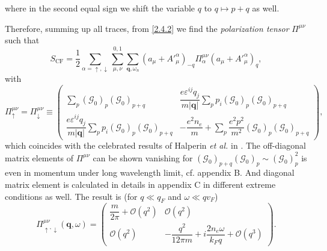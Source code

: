 \documentclass[bachelor,english,numbers]{ustcthesis}
\begin{document}
		where in the second equal sign we shift the variable $q$ to $q\mapsto p+q$ as well.\par
		Therefore, summing up all traces, from \eqref{2.4.2} we find the \emph{polarization tensor} $\Pi^{\mu \nu}$ such that
		\begin{equation}\label{2.4.8}
			S_{\text{CF}}=\dfrac{1}{2}\sum_{\alpha=\uparrow,\downarrow}\sum_{\mu,\nu}^{0,1}\sum_{\bm{q},\omega_n}\left(a_\mu+{A'}_\mu^\alpha\right)_{-q}\Pi^{\mu\nu}_\alpha\left(a_\mu+{A'}_\mu^\alpha\right)_{q},
		\end{equation}
		with
		\begin{equation}\label{2.4.9}
			\Pi^{\mu\nu}_\uparrow=\Pi^{\mu\nu}_\downarrow\equiv \left(\begin{array}{cc}
				\displaystyle\sum_p(\mathcal{G}_0)_p(\mathcal{G}_0)_{p+q} & \displaystyle\dfrac{e \varepsilon^{ij} q_j}{m|\bm{q}|}\sum_{p}p_i(\mathcal{G}_0)_p(\mathcal{G}_0)_{p+q}\\
				\displaystyle\dfrac{e \varepsilon^{ij} q_j}{m|\bm{q}|}\sum_{p}p_i(\mathcal{G}_0)_p(\mathcal{G}_0)_{p+q} & \displaystyle-\dfrac{e^2n_e}{m}+\sum_p\dfrac{e^2p^2}{m^2}(\mathcal{G}_0)_p(\mathcal{G}_0)_{p+q}
			\end{array}\right),
		\end{equation}
		which coincides with the celebrated results of Halperin {\it et al.} in \cite{Halperin1995Theory}. The off-diagonal matrix elements of $\Pi^{\mu \nu}$ can be shown vanishing for $(\mathcal{G}_0)_{p+q}(\mathcal{G}_0)_p\sim(\mathcal{G}_0)_p^2$ is even in momentum under long wavelength limit, cf. appendix B. And diagonal matrix element is calculated in details in appendix C in different extreme conditions as well. The result is (for $q\ll q_F$ and $\omega\ll qv_F$)
		\begin{equation}\label{2.4.10}
			\Pi^{\mu\nu}_{\uparrow,\downarrow}(\bm{q},\omega)=\left(\begin{array}{cc}
				\dfrac{m}{2\pi}+\mathcal{O}(q^2) & \mathcal{O}(q^2) \\
				\mathcal{O}(q^2) & -\dfrac{q^2}{12\pi m}+i\dfrac{2n_e\omega}{k_F q}+\mathcal{O}(q^3)
			\end{array}\right).
		\end{equation}
\end{document}
